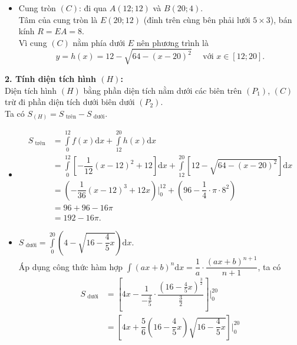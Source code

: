 \begin{ex}
{\begin{itemize}
			\[0 = a(0-4)^2 + 20 \Leftrightarrow 16a = -20 \Leftrightarrow a = -\dfrac{5}{4}. \]
			Suy ra $x = -\dfrac{5}{4}(y-4)^2 + 20 \Rightarrow (y-4)^2 = 16 - \dfrac{4}{5}x$.\\ Vì ta lấy nhánh dưới $y \in [0;4]$ nên $y-4 \le 0$, phương trình là
			\[(P_2) \colon y = g(x) = 4 - \sqrt{16 - \dfrac{4}{5}x} \quad \text{ với } x \in [0;20]. \]
			\item Cung tròn $(C)$: đi qua $A(12;12)$ và $B(20;4)$.\\ Tâm của cung tròn là $E(20;12)$ (đỉnh trên cùng bên phải lưới $5\times 3$), bán kính $R = EA = 8$.\\ Vì cung $(C)$ nằm phía dưới $E$ nên phương trình là
			\[y = h(x) = 12 - \sqrt{64 - (x-20)^2} \quad \text{ với } x \in [12;20]. \]
		\end{itemize}
		\textbf{2. Tính diện tích hình $(H)$:} \\
		Diện tích hình $(H)$ bằng phần diện tích nằm dưới các biên trên $(P_1)$, $(C)$ trừ đi phần diện tích dưới biên dưới $(P_2)$.\\ Ta có $S_{(H)} = S_{\text{ trên}} - S_{\text{ dưới}}$.
		\begin{itemize}
			\item
			\begin{align*}
				S_{\text{ trên}} &= \displaystyle\int\limits_{0}^{12} f(x) \mathrm{d}x + \int\limits_{12}^{20} h(x) \mathrm{d}x \\
				&= \int\limits_{0}^{12} \left[-\dfrac{1}{12}(x-12)^2 + 12 \right] \mathrm{d}x + \int\limits_{12}^{20} \left[12 - \sqrt{64 - (x-20)^2} \right] \mathrm{d}x\\
				&= \left(-\dfrac{1}{36}(x-12)^3 + 12x \right) \Bigg|_0^{12} + \left(96 - \dfrac{1}{4} \cdot \pi \cdot 8^2 \right) \\
				&= 96 + 96 - 16\pi \\
				&= 192 - 16\pi.
			\end{align*}
			\item $S_{\text{ dưới}} = \displaystyle\int\limits_{0}^{20} \left(4 - \sqrt{16 - \dfrac{4}{5}x} \right) \mathrm{d}x$.\\ Áp dụng công thức hàm hợp $\displaystyle\int (ax+b)^n \mathrm{d}x = \dfrac{1}{a} \cdot \dfrac{(ax+b)^{n+1}}{n+1}$, ta có
			\begin{align*}
				S_{\text{ dưới}} &= \left[4x - \dfrac{1}{-\frac{4}{5}} \cdot \dfrac{\left(16 - \frac{4}{5}x\right)^{\frac{3}{2}}}{\frac{3}{2}} \right] \Bigg|_0^{20} \\
				&= \left[4x + \dfrac{5}{6} \left(16 - \dfrac{4}{5}x\right)\sqrt{16 - \dfrac{4}{5}x} \right] \Bigg|_0^{20} \\

\end{align*}
\end{itemize}}
\end{ex}

